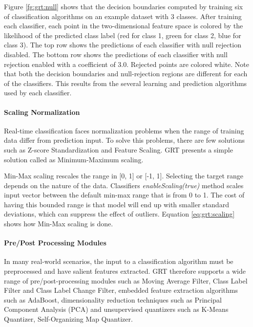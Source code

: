 

Figure \ref{fg:grt:null} shows that the decision boundaries computed by training six of classification algorithms on an example dataset with 3 classes. After training each classifier, each point in the two-dimensional feature space is colored by the likelihood of the predicted class label (red for class 1, green for class 2, blue for class 3). The top row shows the predictions of each classifier with null rejection disabled. The bottom row shows the predictions of each classifier with null rejection enabled with a coefficient of 3.0. Rejected points are colored white. Note that both the decision boundaries and null-rejection regions are different for each of the classifiers. This results from the several learning and prediction algorithms used by each classifier. 

\paragraph*{Scaling Normalization} Real-time classification faces normalization problems when the range of training data differ from prediction input. To solve this problems, there are few solutions such as Z-score Standardization and Feature Scaling. GRT presents a simple solution called as Minimum-Maximum scaling.

Min-Max scaling rescales the range in [0, 1] or [-1, 1]. Selecting the target range depends on the nature of the data. Classifiers \textit{enableScaling(true)} method scales input vector between the default min-max range that is from 0 to 1. The cost of having this bounded range is that model will end up with smaller standard deviations, which can suppress the effect of outliers. Equation \ref{eq:grt:scaling} shows how Min-Max scaling is done.



\paragraph*{Pre/Post Processing Modules} In many real-world scenarios, the input to a classification algorithm must be preprocessed and have salient features extracted. GRT therefore supports a wide range of pre/post-processing modules such as Moving Average Filter, Class Label Filter and Class Label Change Filter, embedded feature extraction algorithms such as AdaBoost, dimensionality reduction techniques such as Principal Component Analysis (PCA) and unsupervised quantizers such as K-Means Quantizer, Self-Organizing Map Quantizer.

